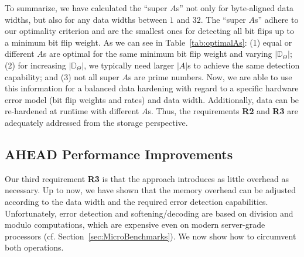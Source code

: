 To summarize, we have calculated the ``super \(A\)s'' not only for byte-aligned data widths, but also for any data widths between $1$ and $32$. The ``super \(A\)s'' adhere to our optimality criterion and are the smallest ones for detecting all bit flips up to a minimum bit flip weight. As we can see in Table~\ref{tab:optimalAs}: (1) equal or different \(A\)s are optimal for the same minimum bit flip weight and varying \(|\mathbb{D}_\Theta|\); (2) for increasing \(|\mathbb{D}_\Theta|\), we typically need larger \(|A|\)s to achieve the same detection capability; and (3) not all super \(A\)s are prime numbers. Now, we are able to use this information for a balanced data hardening with regard to a specific hardware error model (bit flip weights and rates) and data width. Additionally, data can be re-hardened at run\=time with different \(A\)s. Thus, the requirements \textbf{R2} and \textbf{R3} are adequately addressed from the storage perspective.









\subsection{AHEAD Performance Improvements}
\label{sec:ANCodingImprovements}

Our third requirement \textbf{R3} is that the approach introduces as little overhead as necessary. Up to now, we have shown that the memory overhead can be adjusted according to the data width and the required error detection capabilities. Unfortunately, error detection and softening/decoding are based on division and modulo computations, which are expensive even on modern server-grade processors (cf. Section~\ref{sec:MicroBenchmarks}). We now show how to circumvent both operations. %

